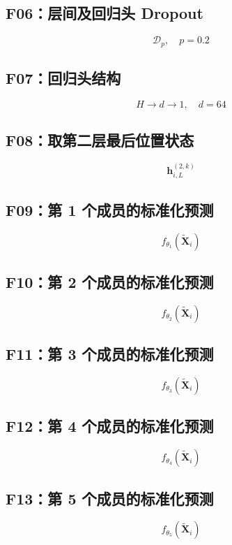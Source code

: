\documentclass[UTF8,a4paper,11pt]{ctexart}
\begin{document}
\subsection*{F06：层间及回归头 Dropout}
\[
\mathcal{D}_{p},\quad p=0.2
\]

\subsection*{F07：回归头结构}
\[
H\rightarrow d\rightarrow1,\quad d=64
\]

\subsection*{F08：取第二层最后位置状态}
\[
\mathbf{h}_{i,L}^{(2,k)}
\]

\subsection*{F09：第 1 个成员的标准化预测}
\[
f_{\theta_1}(\widetilde{\mathbf{X}}_i)
\]

\subsection*{F10：第 2 个成员的标准化预测}
\[
f_{\theta_2}(\widetilde{\mathbf{X}}_i)
\]

\subsection*{F11：第 3 个成员的标准化预测}
\[
f_{\theta_3}(\widetilde{\mathbf{X}}_i)
\]

\subsection*{F12：第 4 个成员的标准化预测}
\[
f_{\theta_4}(\widetilde{\mathbf{X}}_i)
\]

\subsection*{F13：第 5 个成员的标准化预测}
\[
f_{\theta_5}(\widetilde{\mathbf{X}}_i)
\]
\end{document}
